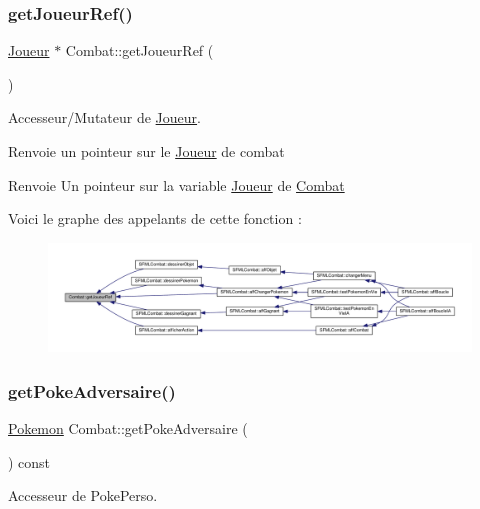 \subsubsection{\texorpdfstring{get\+Joueur\+Ref()}{getJoueurRef()}}
{\footnotesize\ttfamily \hyperlink{class_joueur}{Joueur} $\ast$ Combat\+::get\+Joueur\+Ref (\begin{DoxyParamCaption}{ }\end{DoxyParamCaption})}



Accesseur/\+Mutateur de \hyperlink{class_joueur}{Joueur}. 

Renvoie un pointeur sur le \hyperlink{class_joueur}{Joueur} de combat \begin{DoxyReturn}{Renvoie}
Un pointeur sur la variable \hyperlink{class_joueur}{Joueur} de \hyperlink{class_combat}{Combat} 
\end{DoxyReturn}
Voici le graphe des appelants de cette fonction \+:\nopagebreak
\begin{figure}[H]
\begin{center}
\leavevmode
\includegraphics[width=350pt]{class_combat_af72bd31264a8cdeeb3f3f8c30c727d33_icgraph}
\end{center}
\end{figure}
\mbox{\label{class_combat_aa06e658e7fb4ab91174ba4d832588bae}} 
\subsubsection{\texorpdfstring{get\+Poke\+Adversaire()}{getPokeAdversaire()}}
{\footnotesize\ttfamily \hyperlink{class_pokemon}{Pokemon} Combat\+::get\+Poke\+Adversaire (\begin{DoxyParamCaption}{ }\end{DoxyParamCaption}) const}



Accesseur de Poke\+Perso. 

